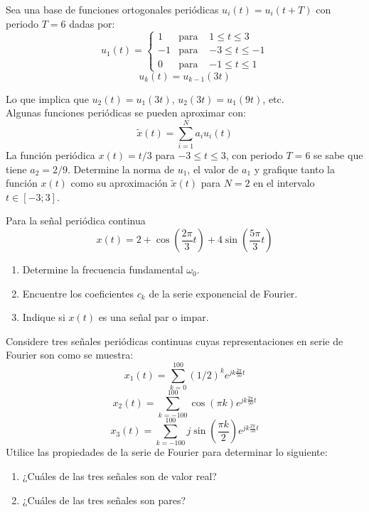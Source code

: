 \begin{ejercicio}
    Sea una base de funciones ortogonales periódicas $u_i(t)=u_i(t+T)$ con periodo $T=6$ dadas por:\\[3pt]
    $$
    u_1(t) = \left\{
        \begin{array}{lll}
            1  & \text{para } &1 \leq t \leq 3\\
            -1 & \text{para } &-3 \leq t \leq -1\\
            0  & \text{para } &-1 \leq t \leq 1
         \end{array}
        \right.
    $$\vspace{3pt}
    $$ u_k(t)=u_{k-1}(3t) $$

    Lo que implica que $u_2(t)=u_1(3t)$, $u_2(3t)=u_1(9t)$, etc.\\
    Algunas funciones periódicas se pueden aproximar con:
    $$ \tilde{x}(t)=\sum_{i=1}^{N}a_i u_i(t) $$
    La función periódica $x(t)=t/3$ para $-3 \leq t \leq 3$, con periodo $T=6$ se sabe que tiene $a_2=2/9$. Determine la norma de $u_1$, el valor de $a_1$ y grafique tanto la función $x(t)$ como su aproximación $\tilde{x}(t)$ para $N=2$ en el intervalo $t\in[-3;3]$.
\end{ejercicio}

\begin{ejercicio}
    Para la señal periódica continua
    $$ x(t) = 2+\cos{\left(\frac{2\pi}{3}t\right)}+4\sin\left(\frac{5\pi}{3}t\right) $$
    \begin{enumerate}
        \item Determine la frecuencia fundamental $\omega_0$.
        \item Encuentre los coeficientes $c_k$ de la serie exponencial de Fourier.
        \item Indique si $x(t)$ es una señal par o impar.
    \end{enumerate}
\end{ejercicio}

\begin{ejercicio}
    Considere tres señales periódicas continuas cuyas representaciones en serie de Fourier son como se muestra:
    $$ x_1(t) = \sum_{k=0}^{100} (1/2)^k e^{jk \frac{2\pi}{50}t} $$
    $$ x_2(t) = \sum_{k=-100}^{100} \cos(\pi k) e^{jk \frac{2\pi}{50}t} $$
    $$ x_3(t) = \sum_{k=-100}^{100} j\sin{\left(\frac{\pi k}{2} \right)} e^{jk \frac{2\pi}{50}t} $$
    Utilice las propiedades de la serie de Fourier para determinar lo siguiente:
    \begin{enumerate}
        \item ¿Cuáles de las tres señales son de valor real?
        \item ¿Cuáles de las tres señales son pares?
    \end{enumerate}
\end{ejercicio}

